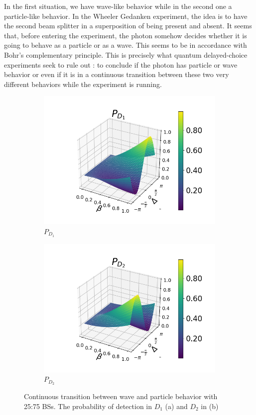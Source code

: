 \documentclass[12pt]{book}
\begin{document}
In the first situation, we have wave-like behavior while in the second one a particle-like behavior. In the Wheeler Gedanken experiment, the idea is to have the second beam splitter in a superposition of being present and absent. It seems that, before entering the experiment, the photon somehow decides whether it is going to behave as a particle or as a wave. This seems to be in accordance with Bohr's complementary principle. This is precisely what quantum delayed-choice experiments seek to rule out \cite{Ma}: to conclude if the photon has particle or wave behavior or even if it is in a continuous transition between these two very different behaviors while the experiment is running.
\begin{figure}[t!]
\centering
\begin{subfigure}[b]{0.40\linewidth}
\includegraphics[width=\linewidth]{images/pd1_2_pi3.png}
\caption{$P_{D_{1}}$}
\end{subfigure}
\begin{subfigure}[b]{0.40\linewidth}
\includegraphics[width=\linewidth]{images/pd2_2_pi3.png}
\caption{$P_{D_{2}}$ }
\label{fig:BS1}
\end{subfigure}
\caption{Continuous transition between wave and particle behavior with 25:75 BSs. The probability of detection in $D_{1}$ (a) and $D_{2}$ in (b)}
\label{pi/3}
\end{figure}
\end{document}
